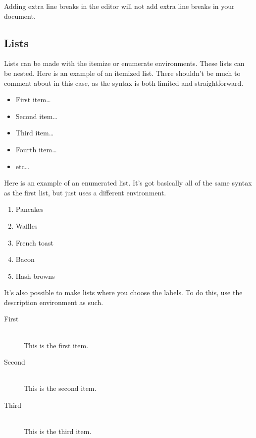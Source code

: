 \documentclass[11pt,letterpaper]{article}
\begin{document}
Adding extra line breaks in the editor will not add extra line breaks in your
document.

\subsection{Lists}

Lists can be made with the itemize or enumerate environments. These lists can be
nested. Here is an example of an itemized list. There shouldn't be much to
comment about in this case, as the syntax is both limited and straightforward.

\begin{itemize}
    \item First item\dots %
    \item Second item\dots
    \item Third item\dots
    \item Fourth item\dots
    \item etc\dots
\end{itemize}

Here is an example of an enumerated list. It's got basically all of the same
syntax as the first list, but just uses a different environment.

\begin{enumerate}
    \item Pancakes
    \item Waffles
    \item French toast
    \item Bacon
    \item Hash browns
\end{enumerate}

It's also possible to make lists where you choose the labels. To do this, use
the description environment as such.

\begin{description}
\item[First] \hfill \\
    This is the first item.
\item[Second] \hfill \\
    This is the second item.
\item[Third] \hfill \\
    This is the third item.
\end{description}
\end{document}
